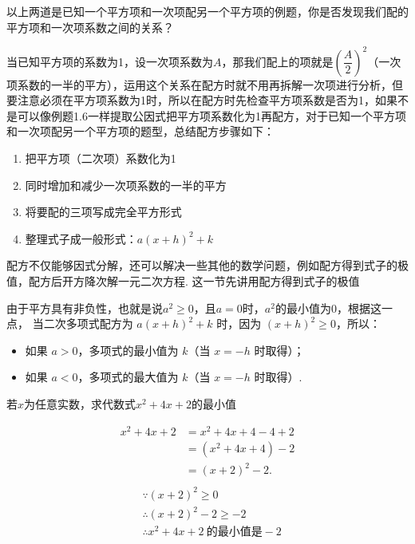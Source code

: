 \documentclass[lang=cn, 10pt, titlestyle=hang, oneside]{elegantbook}
\begin{document}
以上两道是已知一个平方项和一次项配另一个平方项的例题，你是否发现我们配的平方项和一次项系数之间的关系？
\par
当已知平方项的系数为1，设一次项系数为\(A\)，那我们配上的项就是\((\dfrac{A}{2})^2\)（一次项系数的一半的平方），运用这个关系在配方时就不用再拆解一次项进行分析，但要注意必须在平方项系数为1时，所以在配方时先检查平方项系数是否为1，如果不是可以像例题1.6一样提取公因式把平方项系数化为1再配方，对于已知一个平方项和一次项配另一个平方项的题型，总结配方步骤如下：
\begin{enumerate}
    \item 把平方项（二次项）系数化为1
    \item 同时增加和减少一次项系数的一半的平方
    \item 将要配的三项写成完全平方形式
    \item 整理式子成一般形式：\( a(x + h)^2 + k \)
\end{enumerate}
\par
配方不仅能够因式分解，还可以解决一些其他的数学问题，例如配方得到式子的极值，配方后开方降次解一元二次方程. 这一节先讲用配方得到式子的极值
\par
由于平方具有非负性，也就是说\(a^2\geq0\)，且\(a=0\)时，\(a^2\)的最小值为0，根据这一点，
当二次多项式配方为 \( a(x + h)^2 + k \) 时，因为 \( (x + h)^2 \geq 0 \)，所以：
\begin{itemize}[label=]
    \item 如果 \( a > 0 \)，多项式的最小值为 \( k \)（当 \( x = -h \) 时取得）；
    \item 如果 \( a < 0 \)，多项式的最大值为 \( k \)（当 \( x = -h \) 时取得）.
\end{itemize}
\begin{example}
若\(x\)为任意实数，求代数式\(x^2+4x+2\)的最小值
\end{example}

\begin{solution}

\begin{align*}
x^2 + 4x + 2 &= x^2 + 4x + 4 - 4 + 2 \\
&= (x^2 + 4x + 4) - 2 \\
&= (x + 2)^2 - 2.\\
\end{align*}
\begin{align*}
&\because (x + 2)^2 \geq 0\\
&\therefore (x + 2)^2-2 \geq -2\\
&\therefore x^2 + 4x + 2 \  \text{的最小值是}-2
\end{align*}
\end{solution}
\end{document}
